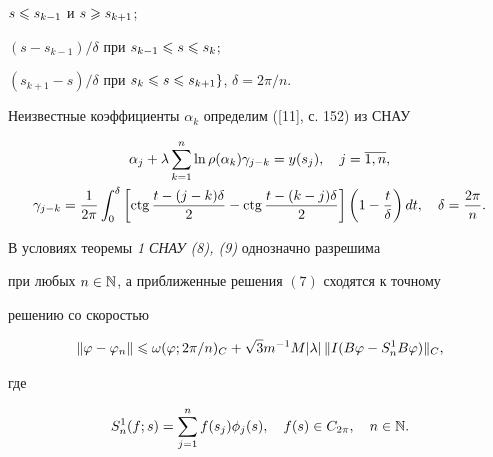 $s\leqslant s_{k-1}$ и $s\geqslant s_{k+1}$;


$(s-s_{k-1})/\delta$ при $s_{k-1}\leqslant s\leqslant s_k$;


$(s_{k+1}-s)/\delta$ при $s_k\leqslant s\leqslant s_{k+1}\}$, $\delta =2\pi/n$. 


Неизвестные коэффициенты $\alpha_k$ определим ([11], с. 152) из СНАУ


\begin{gather}


\alpha_j + \lambda\sum_{k=1}^n \ln \rho(\alpha_k)\gamma_{j-k} = y(s_{j}),


\quad j=\ol{1,n}, \\


%


\gamma_{j-k} = \frac{1}{2\pi}\int_{0}^\delta \left[


\ctg\frac{t-(j-k)\delta}{2}-\ctg\frac{t-(k-j)\delta}{2}


\right]\left(1-\frac{t}{\delta}\right)dt,\quad \delta = \frac{2\pi}{n}.


\end{gather}





\begin{thm}


В условиях теоремы {\em 1 СНАУ (8), (9)} однозначно разрешима 


при любых $n\in\Bbb N$, а приближенные решения $(7)$ сходятся к точному 


решению со скоростью 


$$


\|\vp - \vp_n\|\lea \omega(\vp;2\pi/n)_C +


\sqrt{3}m^{-1}M|\lambda|\,\|I(B\vp - S_n^1B\vp)\|_C,


$$


где 


$$


S_n^1(f;s) = \sum_{j=1}^n f(s_j)\phi_j(s),


\quad f(s)\in C_{2\pi},\quad n\in\N.


$$


\end{thm}





